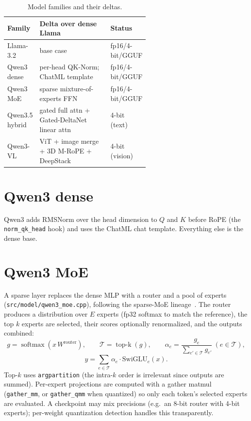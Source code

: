 \documentclass[11pt,a4paper]{report}
\newcommand{\code}[1]{\texttt{#1}}
\newcommand{\softmax}{\operatorname{softmax}}
\begin{document}
\begin{table}[h]
\centering
\caption{Model families and their deltas.}
\label{tab:families}
\small
\begin{tabular}{@{}l p{0.58\linewidth} l@{}}
\toprule
Family & Delta over dense Llama & Status \\
\midrule
Llama-3.2     & base case                                        & fp16/4-bit/GGUF \\
Qwen3 dense   & per-head QK-Norm; ChatML template                & fp16/4-bit/GGUF \\
Qwen3 MoE     & sparse mixture-of-experts FFN                    & fp16/4-bit/GGUF \\
Qwen3.5 hybrid& gated full attn + Gated-DeltaNet linear attn     & 4-bit (text) \\
Qwen3-VL      & ViT + image merge + 3D M-RoPE + DeepStack        & 4-bit (vision) \\
\bottomrule
\end{tabular}
\end{table}

\section{Qwen3 dense}
Qwen3 adds RMSNorm over the head dimension to $Q$ and $K$ before RoPE (the
\code{norm\_qk\_head} hook) and uses the ChatML chat template. Everything else is the
dense base.

\section{Qwen3 MoE}
A sparse layer replaces the dense MLP with a router and a pool of experts
(\code{src/model/qwen3\_moe.cpp}), following the sparse-MoE
lineage~\citep{fedus2022switch,jiang2024mixtral}. The router produces a distribution
over $E$ experts (fp32 softmax to match the reference), the top $k$ experts are
selected, their scores optionally renormalized, and the outputs combined:
\begin{equation}
  g = \softmax(x\,W^{\text{router}}), \qquad
  \mathcal{T} = \operatorname{top\text{-}k}(g), \qquad
  \alpha_e = \frac{g_e}{\sum_{e'\in\mathcal{T}} g_{e'}}\ (e\in\mathcal{T}),
\end{equation}
\begin{equation}
  y = \sum_{e\in\mathcal{T}} \alpha_e \cdot \text{SwiGLU}_e(x).
\end{equation}
Top-$k$ uses \code{argpartition} (the intra-$k$ order is irrelevant since outputs are
summed). Per-expert projections are computed with a gather matmul
(\code{gather\_mm}, or \code{gather\_qmm} when quantized) so only each token's
selected experts are evaluated. A checkpoint may mix precisions (e.g.\ an 8-bit
router with 4-bit experts); per-weight quantization detection handles this
transparently.
\end{document}
